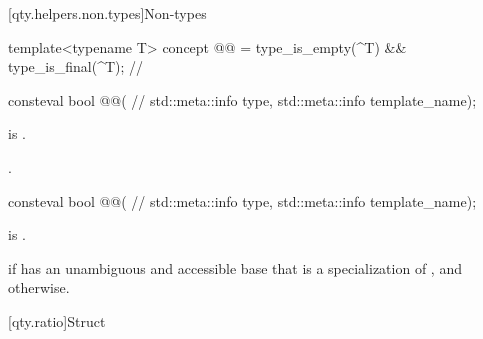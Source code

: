 [qty.helpers.non.types]{Non-types}

\begin{itemdecl}
template<typename T>
concept @@ = type_is_empty(^T) && type_is_final(^T);  // \expos
\end{itemdecl}

\begin{itemdecl}
consteval bool @@(  // \expos
  std::meta::info type, std::meta::info template_name);
\end{itemdecl}

\begin{itemdescr}
\pnum
\expects
{} is .

\pnum
\returns
{}.
\end{itemdescr}

\begin{itemdecl}
consteval bool @@(  // \expos
  std::meta::info type, std::meta::info template_name);
\end{itemdecl}

\begin{itemdescr}
\pnum
\expects
{} is .

\pnum
\returns
{} if
\tcode{[:type:]} has an unambiguous and accessible base
that is a specialization of , and
 otherwise.
\end{itemdescr}

[qty.ratio]{Struct }

